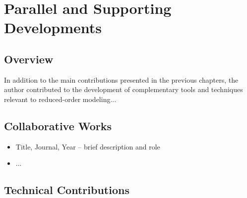 \chapter{Parallel and Supporting Developments}

\section{Overview}
In addition to the main contributions presented in the previous chapters, the author contributed to the development of complementary tools and techniques relevant to reduced-order modeling...

\section{Collaborative Works}
\begin{itemize}
    \item Title, Journal, Year – brief description and role
    \item ...
\end{itemize}

\section{Technical Contributions}
